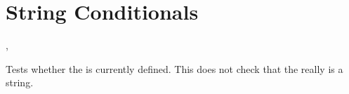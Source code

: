 \documentclass[oneside]{book}
\begin{document}
%

\section{String Conditionals}

\begin{function}{\StrIfExist,\StrIfExistTF}
\begin{syntax}
 
   
\end{syntax}
Tests whether the  is currently defined.  This does not
check that the  really is a string.
\end{function}
\end{document}
